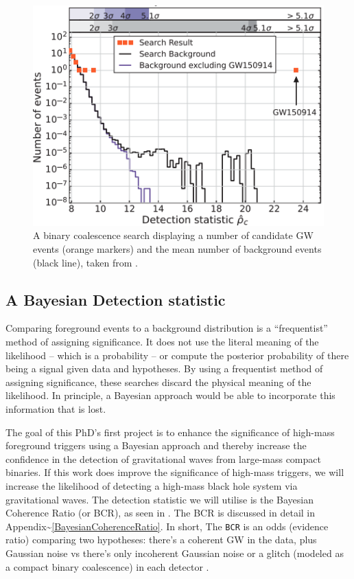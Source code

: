 \documentclass[%
 reprint,
 amsmath,amssymb,
 aps,
]{revtex4-2}
\begin{document}
\begin{figure}[!h]

{\centering \includegraphics[width=0.75\linewidth]{images/GW150914_background} 

}

\caption[Ranking statistic plot for GW150914]{A binary coalescence search displaying a number of candidate GW events (orange markers) and the mean number of background events (black line), taken from \citet{abbott2016observation}.}\label{fig:GW150914background}
\end{figure}

\hypertarget{a-bayesian-detection-statistic}{%
\subsection{A Bayesian Detection statistic}\label{a-bayesian-detection-statistic}}

Comparing foreground events to a background distribution is a ``frequentist'' method of assigning significance. It does
not use the literal meaning of the likelihood -- which is a probability -- or compute the posterior probability of there
being a signal given data and hypotheses. By using a frequentist method of assigning significance, these searches
discard the physical meaning of the likelihood. In principle, a Bayesian approach would be able to incorporate this
information that is lost.

The goal of this PhD's first project is to enhance the significance of high-mass foreground triggers using a Bayesian
approach and thereby increase the confidence in the detection of gravitational waves from large-mass compact binaries.
If this work does improve the significance of high-mass triggers, we will increase the likelihood of detecting a
high-mass black hole system via gravitational waves. The detection statistic we will utilise is the Bayesian Coherence
Ratio (or BCR), as seen in \citet{bcr_paper}. The BCR is discussed in detail in Appendix\textasciitilde\ref{BayesianCoherenceRatio}. In
short, The \texttt{BCR} is an odds (evidence ratio) comparing two hypotheses: there's a coherent GW in the data, plus Gaussian
noise vs there's only incoherent Gaussian noise or a glitch (modeled as a compact binary coalescence) in each detector
\citep{bcr_paper}.
\end{document}
